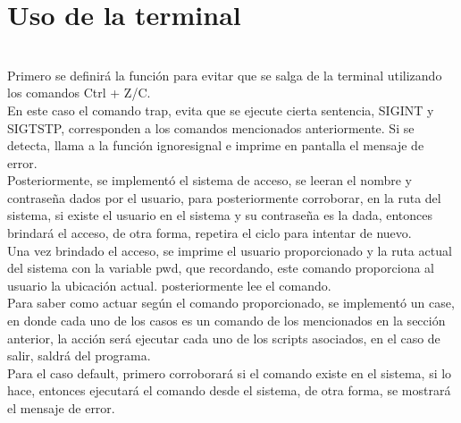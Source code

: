 \documentclass[letterpaper,12pt]{article} %
\begin{document}
\section{Uso de la terminal}\\
Primero se definirá la función para evitar que se salga de la terminal utilizando los comandos Ctrl + Z/C. \\
En este caso el comando trap, evita que se ejecute cierta sentencia, SIGINT y SIGTSTP, corresponden a los comandos mencionados anteriormente. Si se detecta, llama a la función ignoresignal e imprime en pantalla el mensaje de error.\\
Posteriormente, se implementó el sistema de acceso, se leeran el nombre y contraseña dados por el usuario, para posteriormente corroborar, en la ruta del sistema, si existe el usuario en el sistema y su contraseña es la dada, entonces brindará el acceso, de otra forma, repetira el ciclo para intentar de nuevo.\\
Una vez brindado el acceso, se imprime el usuario proporcionado y la ruta actual del sistema con la variable pwd, que recordando, este comando proporciona al usuario la ubicación actual. posteriormente lee el comando.\\
Para saber como actuar según el comando proporcionado, se implementó un case, en donde cada uno de los casos es un comando de los mencionados en la sección anterior, la acción será ejecutar cada uno de los scripts asociados, en el caso de salir, saldrá del programa. \\
Para el caso default, primero corroborará si el comando existe en el sistema, si lo hace, entonces ejecutará el comando desde el sistema, de otra forma, se mostrará el mensaje de error. \\
\newpage
\end{document}
